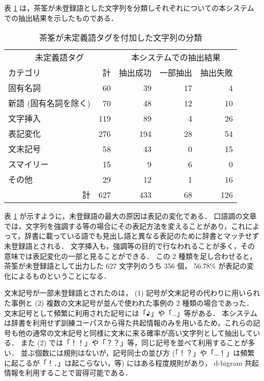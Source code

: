 表 \ref{tab:unk-category} は，茶筌が未登録語とした文字列を分類しそれぞれについての本システムでの抽出結果を示したものである．
\begin{table}[hbt]
\begin{minipage}{\textwidth}
\begin{center}
\caption{茶筌が未定義語タグを付加した文字列の分類}
\label{tab:unk-category}
\begin{tabular}{lrrrr}
\hline
\hline
\multicolumn{2}{c}{未定義語タグ}& \multicolumn{3}{c}{本システムでの抽出結果} \\
カテゴリ               & 計  & 抽出成功 & 一部抽出 & 抽出失敗 \\
\hline
固有名詞               &  60 &  39 & 17 &   4 \\
新語 (固有名詞を除く)  &  70 &  48 & 12 &  10 \\
文字挿入               & 119 &  89 &  4 &  26 \\
表記変化               & 276 & 194 & 28 &  54 \\ 
文末記号               &  58 &  43 &  0 &  15 \\
スマイリー             &  15 &   9 &  6 &   0 \\
その他                 &  29 &  12 &  1 &  16 \\
\hline
\multicolumn{1}{r}{計} & 627 & 433 & 68 & 126 \\
\hline
\hline
\end{tabular}
\end{center}
\end{minipage}
\end{table}
表 \ref{tab:unk-category} が示すように，未登録語の最大の原因は表記の変化である．
口語調の文章では，文字列を強調する等の場合にその表記方法を変えることがあり，これによって，辞書に載っている語でも見出し語と異なる表記のために辞書とマッチせず未登録語とされる．
文字挿入も，強調等の目的で行なわれることが多く，その意味では表記変化の一部と見ることができる．
この 2 種類を足し合わせると，茶筌が未登録語として出力した 627 文字列のうち 356 個， 56.78\% が表記の変化によるものということになる．

文末記号が一部未登録語とされたのは， (1) 記号が文末記号の代わりに用いられた事例と (2) 複数の文末記号が並んで使われた事例の 2 種類の場合であった．
文末記号として頻繁に利用された記号には「♪」や「…」等がある．
本システムは辞書を利用せず訓練コーパスから得た共起情報のみを用いるため，これらの記号も他の通常の文末記号と同様に文末に来る確率が高い文字列として抽出している．
また (2) では「！！」や「？？」等，同じ記号を並べて利用することが多い．
並ぶ個数には規則はないが，記号同士の並び方 (「！？」や「…！」は頻繁に起こるが「！．」は起こらない，等) にはある程度規則があり， d-bigram 共起情報を利用することで習得可能である．

